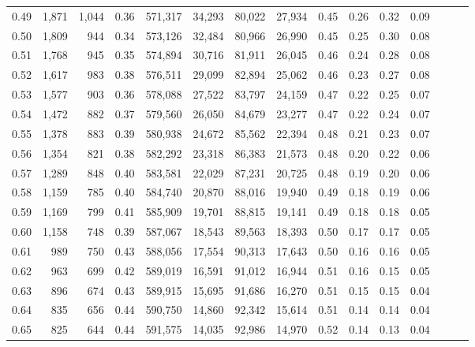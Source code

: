 \begin{tabular}{rrrrrrrrrrrrrrr}
0.49 &   1,871 &  1,044 &  0.36 &  571,317 &   34,293 &   80,022 &   27,934 &  0.45 &  0.26 &  0.32 &      0.09 \\
0.50 &   1,809 &    944 &  0.34 &  573,126 &   32,484 &   80,966 &   26,990 &  0.45 &  0.25 &  0.30 &      0.08 \\
0.51 &   1,768 &    945 &  0.35 &  574,894 &   30,716 &   81,911 &   26,045 &  0.46 &  0.24 &  0.28 &      0.08 \\
0.52 &   1,617 &    983 &  0.38 &  576,511 &   29,099 &   82,894 &   25,062 &  0.46 &  0.23 &  0.27 &      0.08 \\
0.53 &   1,577 &    903 &  0.36 &  578,088 &   27,522 &   83,797 &   24,159 &  0.47 &  0.22 &  0.25 &      0.07 \\
0.54 &   1,472 &    882 &  0.37 &  579,560 &   26,050 &   84,679 &   23,277 &  0.47 &  0.22 &  0.24 &      0.07 \\
0.55 &   1,378 &    883 &  0.39 &  580,938 &   24,672 &   85,562 &   22,394 &  0.48 &  0.21 &  0.23 &      0.07 \\
0.56 &   1,354 &    821 &  0.38 &  582,292 &   23,318 &   86,383 &   21,573 &  0.48 &  0.20 &  0.22 &      0.06 \\
0.57 &   1,289 &    848 &  0.40 &  583,581 &   22,029 &   87,231 &   20,725 &  0.48 &  0.19 &  0.20 &      0.06 \\
0.58 &   1,159 &    785 &  0.40 &  584,740 &   20,870 &   88,016 &   19,940 &  0.49 &  0.18 &  0.19 &      0.06 \\
0.59 &   1,169 &    799 &  0.41 &  585,909 &   19,701 &   88,815 &   19,141 &  0.49 &  0.18 &  0.18 &      0.05 \\
0.60 &   1,158 &    748 &  0.39 &  587,067 &   18,543 &   89,563 &   18,393 &  0.50 &  0.17 &  0.17 &      0.05 \\
0.61 &     989 &    750 &  0.43 &  588,056 &   17,554 &   90,313 &   17,643 &  0.50 &  0.16 &  0.16 &      0.05 \\
0.62 &     963 &    699 &  0.42 &  589,019 &   16,591 &   91,012 &   16,944 &  0.51 &  0.16 &  0.15 &      0.05 \\
0.63 &     896 &    674 &  0.43 &  589,915 &   15,695 &   91,686 &   16,270 &  0.51 &  0.15 &  0.15 &      0.04 \\
0.64 &     835 &    656 &  0.44 &  590,750 &   14,860 &   92,342 &   15,614 &  0.51 &  0.14 &  0.14 &      0.04 \\
0.65 &     825 &    644 &  0.44 &  591,575 &   14,035 &   92,986 &   14,970 &  0.52 &  0.14 &  0.13 &      0.04 \\

\end{tabular}
